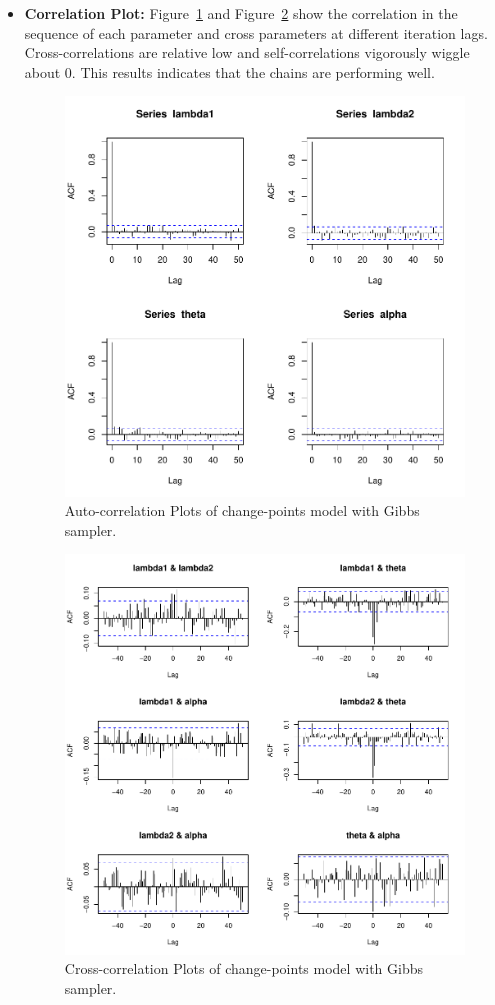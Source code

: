 \documentclass[11pt]{article}
\begin{document}
\begin{enumerate}
\begin{itemize}
        \item \textbf{Correlation Plot:} Figure~\ref{fig:gsac} and Figure~\ref{fig:gscc} show the correlation in the sequence of each parameter and cross parameters at different iteration lags. Cross-correlations are relative low and self-correlations vigorously wiggle about 0. This results indicates that the chains are performing well.
        \begin{figure}[!htb]
            \centering
            \includegraphics[width=0.7\linewidth]{img/gsac-1.pdf}
            \caption{Auto-correlation Plots of change-points model with Gibbs sampler.}
            \label{fig:gsac}
        \end{figure}
        \begin{figure}[!htb]
            \centering
            \includegraphics[width=0.8\linewidth]{img/gsac-2.pdf}
            \caption{Cross-correlation Plots of change-points model with Gibbs sampler.}
            \label{fig:gscc}
        \end{figure}
    \end{itemize}
    

\end{enumerate}
\end{document}
